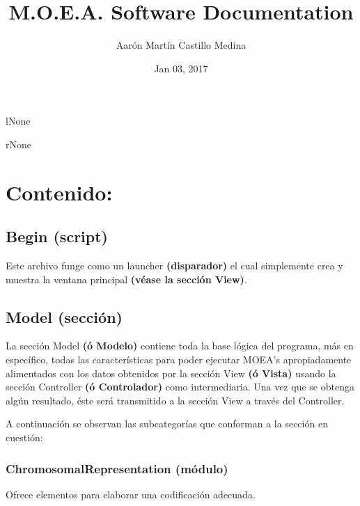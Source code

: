 \documentclass[letterpaper,10pt,english]{sphinxmanual}
\title{M.O.E.A. Software Documentation}
\date{Jan 03, 2017}
\author{Aarón Martín Castillo Medina}
\begin{document}
\maketitle
\tableofcontents
{}\label{index::doc}\begin{wrapfigure}{l}{None}
\centering
\noindent{}
\end{wrapfigure}
\begin{wrapfigure}{r}{None}
\centering
\noindent{}
\end{wrapfigure}


\chapter{Contenido:}
\label{index:contenido}

\section{Begin (script)}
\label{Begin::doc}\label{Begin:begin-script}
Este archivo funge como un launcher \textbf{(disparador)}
el cual simplemente crea y muestra la ventana principal
\textbf{(véase la sección View)}.
\label{Begin:module-Begin}

\section{Model (sección)}
\label{Model/Model:model-seccion}\label{Model/Model::doc}
La sección Model \textbf{(ó Modelo)} contiene toda la base lógica del programa, más en específico, todas las
características para poder ejecutar MOEA's apropiadamente alimentados con los datos obtenidos por
la sección View \textbf{(ó Vista)} usando la sección Controller \textbf{(ó Controlador)} como intermediaria.
Una vez que se obtenga algún resultado, éste será transmitido a la sección View a través del Controller.

A continuación se observan las subcategorías que conforman a la sección en cuestión:


\subsection{ChromosomalRepresentation (módulo)}
\label{Model/ChromosomalRepresentation/ChromosomalRepresentation::doc}\label{Model/ChromosomalRepresentation/ChromosomalRepresentation:chromosomalrepresentation-modulo}
Ofrece elementos para elaborar una codificación adecuada.
\end{document}
